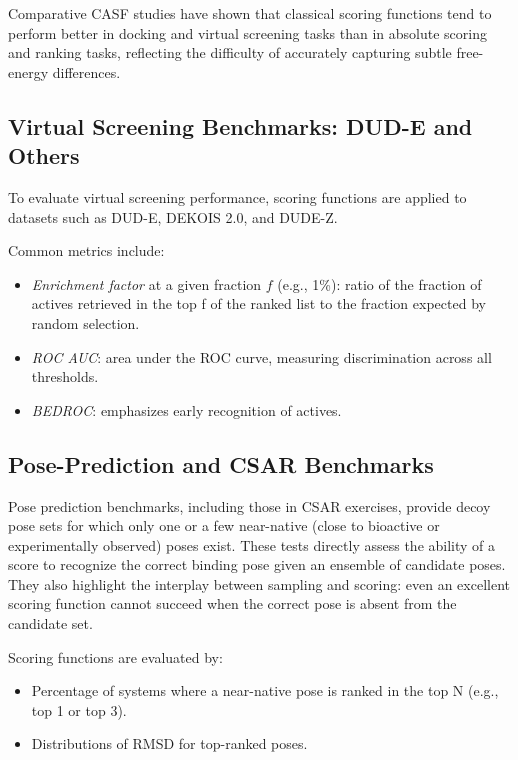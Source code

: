 \documentclass[12pt]{article}
\begin{document}
Comparative CASF studies have shown that classical scoring functions tend to perform better in docking and virtual screening tasks than in absolute scoring and ranking tasks, reflecting the difficulty of accurately capturing subtle free-energy differences.\cite{CH3_Su2019_CASF2016,CH3_Wang2014_CASF2013_Results}

\subsection{Virtual Screening Benchmarks: DUD-E and Others}

To evaluate virtual screening performance, scoring functions are applied to datasets such as DUD-E, DEKOIS 2.0, and DUDE-Z.\cite{CH3_Mysinger2012_DUDE}

Common metrics include:
\begin{itemize}
    \item \textit{Enrichment factor} at a given fraction $f$ (e.g., 1\%): ratio of the fraction of actives retrieved in the top f of the ranked list to the fraction expected by random selection.
    \item \textit{ROC AUC}: area under the ROC curve, measuring discrimination across all thresholds.
    \item \textit{BEDROC}: emphasizes early recognition of actives.
\end{itemize}


\subsection{Pose-Prediction and CSAR Benchmarks}

Pose prediction benchmarks, including those in CSAR exercises, provide decoy pose sets for which only one or a few near-native (close to bioactive or experimentally observed) poses exist.\cite{CH3_CSAR2013} 
These tests directly assess the ability of a score to recognize the correct binding pose given an ensemble of candidate poses. They also highlight the interplay between sampling and scoring: even an excellent scoring function cannot succeed when the correct pose is absent from the candidate set.

Scoring functions are evaluated by:
\begin{itemize}
    \item Percentage of systems where a near-native pose is ranked in the top N (e.g., top 1 or top 3).
    \item Distributions of RMSD for top-ranked poses.
\end{itemize}
\end{document}
